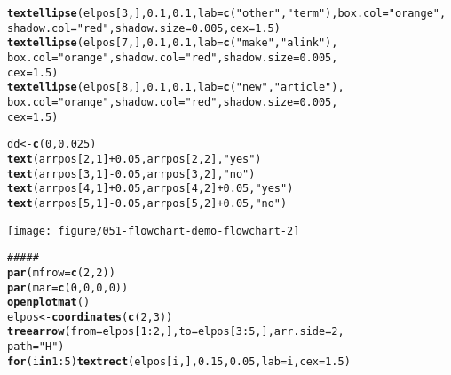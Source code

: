 \documentclass{article}\usepackage[]{graphicx}\usepackage[]{color}
\makeatletter
\def\maxwidth{ %
  \ifdim\Gin@nat@width>\linewidth
    \linewidth
  \else
    \Gin@nat@width
  \fi
}
\newcommand{\hlnum}[1]{\textcolor[rgb]{0.686,0.059,0.569}{#1}}%
\newcommand{\hlstr}[1]{\textcolor[rgb]{0.192,0.494,0.8}{#1}}%
\newcommand{\hlcom}[1]{\textcolor[rgb]{0.678,0.584,0.686}{\textit{#1}}}%
\newcommand{\hlopt}[1]{\textcolor[rgb]{0,0,0}{#1}}%
\newcommand{\hlstd}[1]{\textcolor[rgb]{0.345,0.345,0.345}{#1}}%
\newcommand{\hlkwa}[1]{\textcolor[rgb]{0.161,0.373,0.58}{\textbf{#1}}}%
\newcommand{\hlkwb}[1]{\textcolor[rgb]{0.69,0.353,0.396}{#1}}%
\newcommand{\hlkwc}[1]{\textcolor[rgb]{0.333,0.667,0.333}{#1}}%
\newcommand{\hlkwd}[1]{\textcolor[rgb]{0.737,0.353,0.396}{\textbf{#1}}}%
\newenvironment{kframe}{%
 \def\at@end@of@kframe{}%
 \ifinner\ifhmode%
  \def\at@end@of@kframe{\end{minipage}}%
  \begin{minipage}{\columnwidth}%
 \fi\fi%
 \def\FrameCommand##1{\hskip\@totalleftmargin \hskip-\fboxsep
 \colorbox{shadecolor}{##1}\hskip-\fboxsep
     \hskip-\linewidth \hskip-\@totalleftmargin \hskip\columnwidth}%
 \MakeFramed {\advance\hsize-\width
   \@totalleftmargin\z@ \linewidth\hsize
   \@setminipage}}%
 {\par\unskip\endMakeFramed%
 \at@end@of@kframe}
\newenvironment{knitrout}{}{} %
\makeatother
\begin{document}
\begin{knitrout}
\begin{kframe}
\begin{alltt}
\hlkwd{textellipse}\hlstd{(elpos[}\hlnum{3}\hlstd{, ],} \hlnum{0.1}\hlstd{,} \hlnum{0.1}\hlstd{,} \hlkwc{lab} \hlstd{=} \hlkwd{c}\hlstd{(}\hlstr{"other"}\hlstd{,} \hlstr{"term"}\hlstd{),} \hlkwc{box.col} \hlstd{=} \hlstr{"orange"}\hlstd{,}
    \hlkwc{shadow.col} \hlstd{=} \hlstr{"red"}\hlstd{,} \hlkwc{shadow.size} \hlstd{=} \hlnum{0.005}\hlstd{,} \hlkwc{cex} \hlstd{=} \hlnum{1.5}\hlstd{)}
\hlkwd{textellipse}\hlstd{(elpos[}\hlnum{7}\hlstd{, ],} \hlnum{0.1}\hlstd{,} \hlnum{0.1}\hlstd{,} \hlkwc{lab} \hlstd{=} \hlkwd{c}\hlstd{(}\hlstr{"make"}\hlstd{,} \hlstr{"a link"}\hlstd{),}
    \hlkwc{box.col} \hlstd{=} \hlstr{"orange"}\hlstd{,} \hlkwc{shadow.col} \hlstd{=} \hlstr{"red"}\hlstd{,} \hlkwc{shadow.size} \hlstd{=} \hlnum{0.005}\hlstd{,}
    \hlkwc{cex} \hlstd{=} \hlnum{1.5}\hlstd{)}
\hlkwd{textellipse}\hlstd{(elpos[}\hlnum{8}\hlstd{, ],} \hlnum{0.1}\hlstd{,} \hlnum{0.1}\hlstd{,} \hlkwc{lab} \hlstd{=} \hlkwd{c}\hlstd{(}\hlstr{"new"}\hlstd{,} \hlstr{"article"}\hlstd{),}
    \hlkwc{box.col} \hlstd{=} \hlstr{"orange"}\hlstd{,} \hlkwc{shadow.col} \hlstd{=} \hlstr{"red"}\hlstd{,} \hlkwc{shadow.size} \hlstd{=} \hlnum{0.005}\hlstd{,}
    \hlkwc{cex} \hlstd{=} \hlnum{1.5}\hlstd{)}

\hlstd{dd} \hlkwb{<-} \hlkwd{c}\hlstd{(}\hlnum{0}\hlstd{,} \hlnum{0.025}\hlstd{)}
\hlkwd{text}\hlstd{(arrpos[}\hlnum{2}\hlstd{,} \hlnum{1}\hlstd{]} \hlopt{+} \hlnum{0.05}\hlstd{, arrpos[}\hlnum{2}\hlstd{,} \hlnum{2}\hlstd{],} \hlstr{"yes"}\hlstd{)}
\hlkwd{text}\hlstd{(arrpos[}\hlnum{3}\hlstd{,} \hlnum{1}\hlstd{]} \hlopt{-} \hlnum{0.05}\hlstd{, arrpos[}\hlnum{3}\hlstd{,} \hlnum{2}\hlstd{],} \hlstr{"no"}\hlstd{)}
\hlkwd{text}\hlstd{(arrpos[}\hlnum{4}\hlstd{,} \hlnum{1}\hlstd{]} \hlopt{+} \hlnum{0.05}\hlstd{, arrpos[}\hlnum{4}\hlstd{,} \hlnum{2}\hlstd{]} \hlopt{+} \hlnum{0.05}\hlstd{,} \hlstr{"yes"}\hlstd{)}
\hlkwd{text}\hlstd{(arrpos[}\hlnum{5}\hlstd{,} \hlnum{1}\hlstd{]} \hlopt{-} \hlnum{0.05}\hlstd{, arrpos[}\hlnum{5}\hlstd{,} \hlnum{2}\hlstd{]} \hlopt{+} \hlnum{0.05}\hlstd{,} \hlstr{"no"}\hlstd{)}
\end{alltt}
\end{kframe}
\texttt{[image: figure/051-flowchart-demo-flowchart-2]} 
\begin{kframe}\begin{alltt}
\hlcom{##### }
\hlkwd{par}\hlstd{(}\hlkwc{mfrow} \hlstd{=} \hlkwd{c}\hlstd{(}\hlnum{2}\hlstd{,} \hlnum{2}\hlstd{))}
\hlkwd{par}\hlstd{(}\hlkwc{mar} \hlstd{=} \hlkwd{c}\hlstd{(}\hlnum{0}\hlstd{,} \hlnum{0}\hlstd{,} \hlnum{0}\hlstd{,} \hlnum{0}\hlstd{))}
\hlkwd{openplotmat}\hlstd{()}
\hlstd{elpos} \hlkwb{<-} \hlkwd{coordinates}\hlstd{(}\hlkwd{c}\hlstd{(}\hlnum{2}\hlstd{,} \hlnum{3}\hlstd{))}
\hlkwd{treearrow}\hlstd{(}\hlkwc{from} \hlstd{= elpos[}\hlnum{1}\hlopt{:}\hlnum{2}\hlstd{, ],} \hlkwc{to} \hlstd{= elpos[}\hlnum{3}\hlopt{:}\hlnum{5}\hlstd{, ],} \hlkwc{arr.side} \hlstd{=} \hlnum{2}\hlstd{,}
    \hlkwc{path} \hlstd{=} \hlstr{"H"}\hlstd{)}
\hlkwa{for} \hlstd{(i} \hlkwa{in} \hlnum{1}\hlopt{:}\hlnum{5}\hlstd{)} \hlkwd{textrect}\hlstd{(elpos[i, ],} \hlnum{0.15}\hlstd{,} \hlnum{0.05}\hlstd{,} \hlkwc{lab} \hlstd{= i,} \hlkwc{cex} \hlstd{=} \hlnum{1.5}\hlstd{)}


\end{alltt}
\end{kframe}
\end{knitrout}
\end{document}
